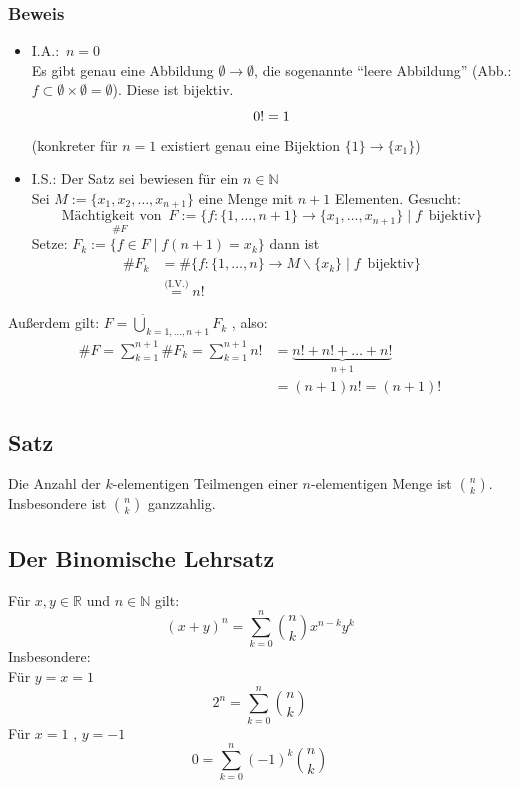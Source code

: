 \subsubsection{Beweis}
\begin{itemize}
 \item \(\text{I.A.:} \enspace n=0\) \\
Es gibt genau eine Abbildung \( \emptyset \rightarrow \emptyset \), die sogenannte  \enquote{leere Abbildung}
(Abb.: \( f \subset \emptyset \times \emptyset = \emptyset \)). Diese ist bijektiv. 
\[
0! = 1 \\
\]
(konkreter für \( n=1\) existiert genau eine Bijektion \( \{1\} \longrightarrow \{x_1\} \))
\item I.S.: Der Satz sei bewiesen für ein \( n \in \mathbb{N}\) \\
Sei \(M:=\{x_1, x_2, \ldots, x_{n+1}\} \) eine Menge mit \(n+1\) Elementen. Gesucht:
\[
\underset{\# F}{\text{Mächtigkeit von} \enspace F}:=\Big\{f:\{1, \ldots, n+1\} \rightarrow \{ x_1, \ldots, x_{n+1}\} \mid f \enspace \text{bijektiv} \Big\}
\]
Setze: \( F_k := \{ f \in F \mid f(n+1)=x_k\}\) dann ist
\begin{align*}
\# F_k &= \# \bigg\{ f : \{1, \ldots, n\} \rightarrow M \backslash \{x_k\} \mid f \enspace \text{bijektiv} \bigg\} \\
&\overset{\text{(I.V.)}}{=} n!
\end{align*}
\end{itemize}
Außerdem gilt: \( F = \underset{k=1, \ldots, n+1}{\dot\bigcup} F_k\) , also:
\begin{align*}
\# F = \sum \limits_{k=1}^{n+1} \# F_k = \sum \limits_{k=1}^{n+1} n! &= \underbrace{n! + n! + \ldots + n!}_{n+1} \\
&= (n+1) n! = (n+1)!
\end{align*}

\subsection{Satz}
Die Anzahl der \(k\)-elementigen Teilmengen einer \(n\)-elementigen Menge ist \(\binom{n}{k}\). \\ Insbesondere ist \(\binom{n}{k}\) ganzzahlig.

\subsection{Der Binomische Lehrsatz}
Für \( x,y \in \mathbb{R}\) und \(n \in \mathbb{N}\) gilt:
\[
\boxed{(x+y)^n = \sum \limits_{k=0}^{n} \binom{n}{k} x^{n-k} y^k}
\]
Insbesondere: \\ Für \(y=x=1\) 
\[
2^n = \sum \limits_{k=0}^{n} \binom{n}{k} 
\]
Für \(x=1\) , \(y=-1\)
\[
0= \sum \limits_{k=0}^{n} (-1)^k \binom{n}{k} 
\]

